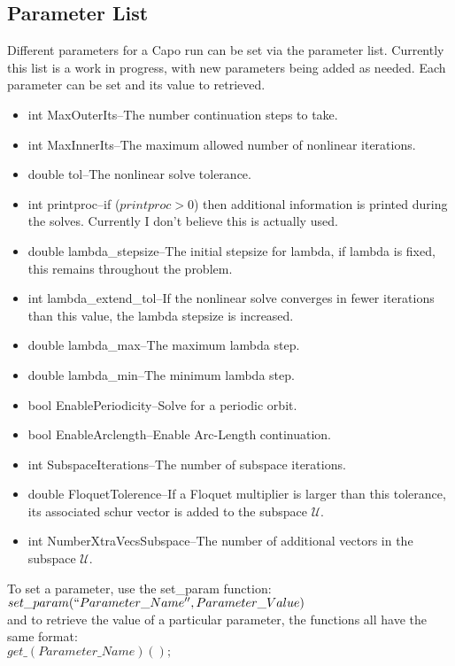 \documentclass[11pt]{article}
\begin{document}
\subsection{Parameter List}
Different parameters for a Capo run can be set via the parameter 
list.  Currently this list is a work in progress, with new parameters 
being added as needed.  Each parameter can be set and its
value to retrieved.

\begin{itemize}
    \item int MaxOuterIts--The number continuation steps to take.
    \item int MaxInnerIts--The maximum allowed number of
      nonlinear iterations.
    \item double tol--The nonlinear solve tolerance.
    \item int printproc--if ($printproc>0$) then additional information
      is printed during the solves.  Currently I don't believe this
      is actually used.
    \item double lambda\_stepsize--The initial stepsize for lambda, if
      lambda is fixed, this remains throughout the problem.
    \item int lambda\_extend\_tol--If the nonlinear solve converges in 
      fewer iterations than this value, the lambda stepsize is increased.
    \item double lambda\_max--The maximum lambda step.
    \item double lambda\_min--The minimum lambda step.
    \item bool EnablePeriodicity--Solve for a periodic orbit.
    \item bool EnableArclength--Enable Arc-Length continuation.
    \item int SubspaceIterations--The number of subspace iterations.
    \item double FloquetTolerence--If a Floquet multiplier is
      larger than this tolerance, its associated schur vector
      is added to the subspace $\mathcal{U}$.
    \item int NumberXtraVecsSubspace--The number of additional
      vectors in the subspace $\mathcal{U}$.
\end{itemize}
To set a parameter, use the set\_param function:\\
$set\_param(``Parameter\_Name'',Parameter\_Value)$ \\
and to retrieve the value of a particular parameter, the 
functions all have the same format:\\
$get\_(Parameter\_Name)();$  
\end{document}

